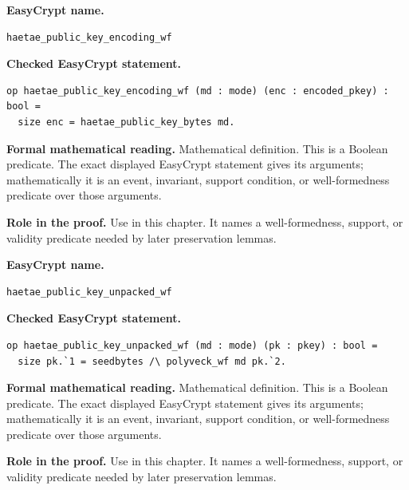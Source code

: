 \begin{formaldefinition}
\noindent\textbf{EasyCrypt name.}
\begin{lstlisting}[language=EasyCrypt,basicstyle=\ttfamily\scriptsize]
haetae_public_key_encoding_wf
\end{lstlisting}
\noindent\textbf{Checked EasyCrypt statement.}
\begin{lstlisting}[language=EasyCrypt,basicstyle=\ttfamily\scriptsize]
op haetae_public_key_encoding_wf (md : mode) (enc : encoded_pkey) : bool =
  size enc = haetae_public_key_bytes md.
\end{lstlisting}
\noindent\textbf{Formal mathematical reading.}
Mathematical definition. This is a Boolean predicate.  The exact displayed EasyCrypt statement gives its arguments; mathematically it is an event, invariant, support condition, or well-formedness predicate over those arguments.

\noindent\textbf{Role in the proof.}
Use in this chapter. It names a well-formedness, support, or validity predicate needed by later preservation lemmas.

\end{formaldefinition}

\begin{formaldefinition}
\noindent\textbf{EasyCrypt name.}
\begin{lstlisting}[language=EasyCrypt,basicstyle=\ttfamily\scriptsize]
haetae_public_key_unpacked_wf
\end{lstlisting}
\noindent\textbf{Checked EasyCrypt statement.}
\begin{lstlisting}[language=EasyCrypt,basicstyle=\ttfamily\scriptsize]
op haetae_public_key_unpacked_wf (md : mode) (pk : pkey) : bool =
  size pk.`1 = seedbytes /\ polyveck_wf md pk.`2.
\end{lstlisting}
\noindent\textbf{Formal mathematical reading.}
Mathematical definition. This is a Boolean predicate.  The exact displayed EasyCrypt statement gives its arguments; mathematically it is an event, invariant, support condition, or well-formedness predicate over those arguments.

\noindent\textbf{Role in the proof.}
Use in this chapter. It names a well-formedness, support, or validity predicate needed by later preservation lemmas.

\end{formaldefinition}

